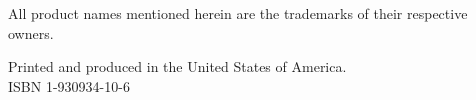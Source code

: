 \begin{minipage}[t][3cm][b]{\textwidth}
\begin{center}
All product names mentioned herein are the trademarks of their respective owners.
\end{center}
\end{minipage}


\begin{minipage}[t][3cm][b]{\textwidth}
\begin{center}
Printed and produced in the United States of America.\\
ISBN 1-930934-10-6
\end{center}
\end{minipage}

